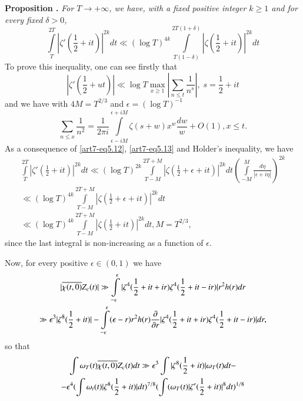 \medskip
\noindent
{\bfseries Proposition .\label{art7-prop10}}
\textit{For $T \to+ \infty$, we have, with a fixed positive integer $k \geqslant 1$ and for every fixed $\delta > 0$,}
\begin{equation}
\int\limits^{2T}_T  |\zeta' (\frac{1}{2} + it) |^{2k} dt \ll (\log T)^{4k} \int\limits^{2T (1+\delta)}_{T(1-\delta)} |\zeta (\frac{1}{2} + it)|^{2k} dt\label{art7-eq5.11} 
\end{equation}
To prove this inequality, one can see firstly that 
\begin{equation}
|\zeta' (\frac{1}{2} + ut)| \ll \log T \max\limits_{x \geqslant 1} \left|\sum\limits_{n \leqslant t} \frac{1}{n^s} \right|, \; s = \frac{1}{2} + it 
\label{art7-5.12}
\end{equation}
and we have with $4M = T^{2/3}$ and $\epsilon = (\log T)^{-1}$
\begin{equation}
\sum\limits_{n \leqslant x} \frac{1}{n^2} = \frac{1}{2\pi  i} \int\limits^{\epsilon + i M}_{\epsilon - i M} \zeta(s+ w)  x^w \frac{dw}{w} + O(1), x \leqslant t.\label{art7-eq5.13}
\end{equation}
As a consequence of \eqref{art7-eq5.12}, \eqref{art7-eq5.13} and Holder's inequality, we have
\begin{gather}
\int\limits^{2T}_T |\zeta' (\frac{1}{2} + it)|^{2k} dt \ll (\log T)^{2k} \int\limits^{2T+ M}_{T-M} |\zeta(\frac{1}{2} + \epsilon + it)|^{2k} dt \left( \int\limits^M_{-M} \frac{d\eta}{|\epsilon + i\eta|}\right)^{2k} \label{art7-eq5.14}\\
\ll( \log T)^{4k} \int\limits^{2T+M}_{T-M} |\zeta(\frac{1}{2} + \epsilon + it)|^{2k} dt\\
\ll (\log T)^{4k} \int\limits^{2T+ M}_{T-M} |\zeta(\frac{1}{2} + it) |^{2k} dt, M = T^{2/3},
\end{gather}\pageoriginale 
since the last integral is non-increasing as a function of $\epsilon$.

Now, for every positive $\epsilon \in (0,1)$ we have 
\begin{gather}
|\overline{\chi (t,0)} Z_c (t)| \gg \int\limits^\epsilon_{-\epsilon} |\zeta^4 (\frac{1}{2} +it + ir) \zeta^4 (\frac{1}{2} + it - ir) | r^2 h (r) dr \notag\\
\gg \epsilon^3 |\zeta^8 (\frac{1}{2} + it)| - \int\limits^{\epsilon} _{-\epsilon} (\epsilon -r) r^2 h(r) \frac{\partial}{\partial r} |\zeta^4(\frac{1}{2} + it + ir) \zeta^4 (\frac{1}{2} + it - ir)| dr, \label{art7-eq5.15}
\end{gather}
so that 
\begin{gather}
\int \omega_T (t) \overline{\chi (t, 0)} Z_c (t) dt \gg \epsilon^3 \int |\zeta^8 (\frac{1}{2} + it)| \omega_T (t) dt - \label{art7-5.16}\\
-\epsilon^4(\int \omega_t (t) |\zeta^8 (\frac{1}{2} + it)| dt)^{7/8} (\int (\omega_T (t)| \zeta' (\frac{1}{2} + it)|^8 dt)^{1/8} \notag
\end{gather}

